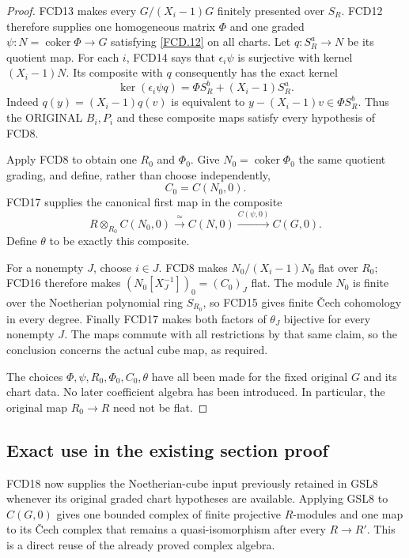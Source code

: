\begin{proof}
FCD13 makes every $G/(X_i-1)G$ finitely presented over $S_R$.
FCD12 therefore supplies one homogeneous matrix $\Phi$ and
one graded $\psi:N=\operatorname{coker}\Phi\to G$ satisfying
\eqref{FCD.12} on all charts.
Let $q:S_R^a\to N$ be its quotient map.
For each $i$, FCD14 says that $\epsilon_i\psi$ is surjective
with kernel $(X_i-1)N$.  Its composite with $q$ consequently
has the exact kernel
\[
 \ker(\epsilon_i\psi q)=\Phi S_R^b+(X_i-1)S_R^a.
\]
Indeed $q(y)=(X_i-1)q(v)$ is equivalent to
$y-(X_i-1)v\in\Phi S_R^b$.  Thus the ORIGINAL $B_i,P_i$
and these composite maps satisfy every hypothesis of FCD8.

Apply FCD8 to obtain one $R_0$ and $\Phi_0$.  Give
$N_0=\operatorname{coker}\Phi_0$ the same quotient grading,
and define, rather than choose independently,
\[
 C_0=C(N_0,0).
\]
FCD17 supplies the canonical first map in the composite
\[
 R\otimes_{R_0}C(N_0,0)
 \xrightarrow{\ \simeq\ } C(N,0)
 \xrightarrow{C(\psi,0)} C(G,0).
\]
Define $\theta$ to be exactly this composite.

For a nonempty $J$, choose $i\in J$.
FCD8 makes $N_0/(X_i-1)N_0$ flat over $R_0$; FCD16
therefore makes $(N_0[X_J^{-1}])_0=(C_0)_J$ flat.
The module $N_0$ is finite over the Noetherian polynomial ring
$S_{R_0}$, so FCD15 gives finite \v Cech cohomology in every
degree.  Finally FCD17 makes both factors of $\theta_J$
bijective for every nonempty $J$.  The maps commute with all
restrictions by that same claim, so the conclusion concerns
the actual cube map, as required.

The choices $\Phi,\psi,R_0,\Phi_0,C_0,\theta$ have all
been made for the fixed original $G$ and its chart data.
No later coefficient algebra has been introduced.  In particular,
the original map $R_0\to R$ need not be flat.
\end{proof}

\subsection{Exact use in the existing section proof}

FCD18 now supplies the Noetherian-cube input previously retained in
GSL8 whenever its original graded chart hypotheses are available.
Applying GSL8 to $C(G,0)$ gives one bounded complex of finite
projective $R$-modules and one map to its \v Cech complex that
remains a quasi-isomorphism after every $R\to R'$.  This is a
direct reuse of the already proved complex algebra.

